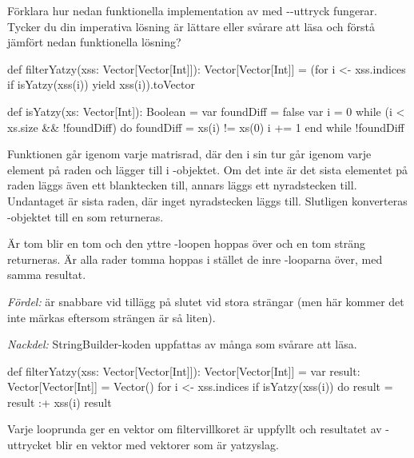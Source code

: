 \Subtask Förklara hur nedan funktionella implementation av  med --uttryck fungerar. Tycker du din imperativa lösning är lättare eller svårare att läsa och förstå jämfört nedan funktionella lösning?
\begin{CodeSmall}
def filterYatzy(xss: Vector[Vector[Int]]): Vector[Vector[Int]] = 
  (for i <- xss.indices if isYatzy(xss(i)) yield xss(i)).toVector
\end{CodeSmall}


\SOLUTION

\TaskSolved \what

\SubtaskSolved  \begin{Code}
def isYatzy(xs: Vector[Int]): Boolean = 
  var foundDiff = false
  var i = 0
  while (i < xs.size && !foundDiff) do
    foundDiff = xs(i) != xs(0)
    i += 1
  end while
  !foundDiff
\end{Code}


\SubtaskSolved  Funktionen går igenom varje matrisrad, där den i sin tur går igenom
varje element på raden och lägger till i -objektet. Om det inte är
det sista elementet på raden läggs även ett blanktecken till, annars läggs ett
nyradstecken till. Undantaget är sista raden, där inget nyradstecken läggs till.
Slutligen konverteras -objektet till en  som
returneras.


Är  tom blir  en tom  och den yttre -loopen hoppas över och en tom sträng returneras.
Är alla rader tomma hoppas i stället de inre -looparna över, med samma resultat.

\emph{Fördel:}  är snabbare vid tillägg på slutet vid stora strängar (men här kommer det inte märkas eftersom strängen är så liten).

\emph{Nackdel:} StringBuilder-koden uppfattas av många som svårare att läsa.

\SubtaskSolved
\begin{Code}
def filterYatzy(xss: Vector[Vector[Int]]): Vector[Vector[Int]] = 
  var result: Vector[Vector[Int]] = Vector()
  for i <- xss.indices if isYatzy(xss(i)) do result = result :+ xss(i)
  result
\end{Code}

\SubtaskSolved  Varje looprunda ger en vektor  om filtervillkoret är uppfyllt och resultatet av -uttrycket blir en vektor med vektorer som är yatzyslag.

\QUESTEND



